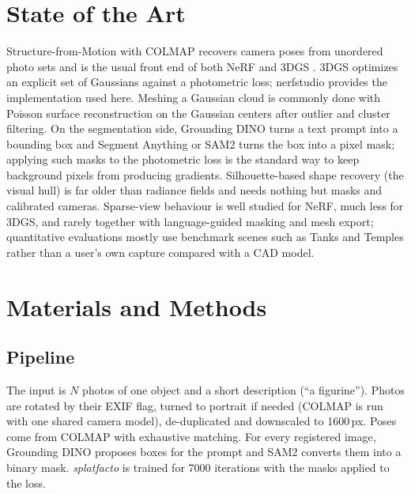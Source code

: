 \documentclass[conference]{IEEEtran}
\begin{document}
\section{State of the Art}

Structure-from-Motion with COLMAP \cite{schoenberger2016sfm} recovers camera poses from unordered photo sets and is the usual front end of both NeRF \cite{mildenhall2020nerf} and 3DGS \cite{kerbl20233dgs}. 3DGS optimizes an explicit set of Gaussians against a photometric loss; nerfstudio \cite{tancik2023nerfstudio} provides the implementation used here. Meshing a Gaussian cloud is commonly done with Poisson surface reconstruction \cite{kazhdan2006poisson} on the Gaussian centers after outlier and cluster filtering. On the segmentation side, Grounding DINO \cite{liu2023groundingdino} turns a text prompt into a bounding box and Segment Anything \cite{kirillov2023sam} or SAM2 \cite{ravi2024sam2} turns the box into a pixel mask; applying such masks to the photometric loss is the standard way to keep background pixels from producing gradients. Silhouette-based shape recovery (the visual hull) is far older than radiance fields and needs nothing but masks and calibrated cameras. Sparse-view behaviour is well studied for NeRF, much less for 3DGS, and rarely together with language-guided masking and mesh export; quantitative evaluations mostly use benchmark scenes such as Tanks and Temples \cite{knapitsch2017tanks} rather than a user's own capture compared with a CAD model.

\section{Materials and Methods}

\subsection{Pipeline}
The input is $N$ photos of one object and a short description (``a figurine''). Photos are rotated by their EXIF flag, turned to portrait if needed (COLMAP is run with one shared camera model), de-duplicated and downscaled to 1600\,px. Poses come from COLMAP with exhaustive matching. For every registered image, Grounding DINO proposes boxes for the prompt and SAM2 converts them into a binary mask. \emph{splatfacto} is trained for 7000 iterations with the masks applied to the loss.
\end{document}
